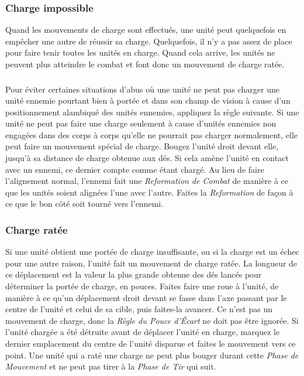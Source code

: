 \subsubsection*{Charge impossible}

Quand les mouvements de charge sont effectués, une unité peut quelquefois en empêcher une autre de réussir sa charge. Quelquefois, il n'y a pas assez de place pour faire tenir toutes les unités en charge. Quand cela arrive, les unités ne peuvent plus atteindre le combat et font donc un mouvement de charge ratée.

\subsubsection*{}

Pour éviter certaines situations d'abus où une unité ne peut pas charger une unité ennemie pourtant bien à portée et dans son champ de vision à cause d'un positionnement alambiqué des unités ennemies, appliquez la règle suivante. Si une unité ne peut pas faire une charge seulement à cause d'unités ennemies non engagées dans des corps à corps qu'elle ne pourrait pas charger normalement, elle peut faire un mouvement spécial de charge. Bougez l'unité droit devant elle, jusqu'à sa distance de charge obtenue aux dés. Si cela amène l'unité en contact avec un ennemi, ce dernier compte comme étant chargé. Au lieu de faire l'alignement normal, l'ennemi fait une \emph{Reformation de Combat} de manière à ce que les unités soient alignées l'une avec l'autre. Faites la \emph{Reformation} de façon à ce que le bon côté soit tourné vers l'ennemi.

\subsubsection*{Charge ratée}

Si une unité obtient une portée de charge insuffisante, ou si la charge est un échec pour une autre raison, l'unité fait un mouvement de charge ratée. La longueur de ce déplacement est la valeur la plus grande obtenue des dés lancés pour déterminer la portée de charge, en pouces. Faites faire une roue à l'unité, de manière à ce qu'un déplacement droit devant se fasse dans l'axe passant par le centre de l'unité et celui de sa cible, puis faites-la avancer. Ce n'est pas un mouvement de charge, donc la \emph{Règle du Pouce d'Écart} ne doit pas être ignorée. Si l'unité chargée a été détruite avant de déplacer l'unité en charge, marquez le dernier emplacement du centre de l'unité disparue et faites le mouvement vers ce point. Une unité qui a raté une charge ne peut plus bouger durant cette \emph{Phase de Mouvement} et ne peut pas tirer à la \emph{Phase de Tir} qui suit.

